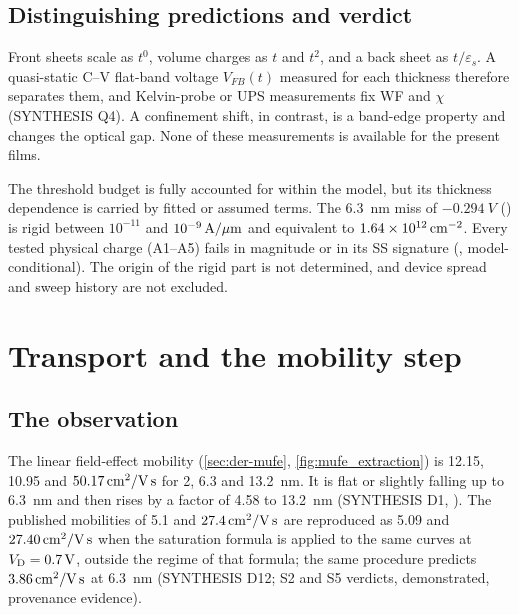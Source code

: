 \subsection{Distinguishing predictions and verdict}
Front sheets scale as $t^0$, volume charges as $t$ and $t^2$, and a back sheet as $t/\varepsilon_s$. A quasi-static C--V flat-band voltage $V_{FB}(t)$ measured for each thickness therefore separates them, and Kelvin-probe or UPS measurements fix WF and $\chi$ (SYNTHESIS Q4). A confinement shift, in contrast, is a band-edge property and changes the optical gap. None of these measurements is available for the present films.

\begin{keyresult}[title={Electrostatics: verdict}]
The threshold budget is fully accounted for within the model, but its thickness dependence is carried by fitted or assumed terms. The \SI{6.3}{nm} miss of $-\SI{0.294}{V}$ () is rigid between $10^{-11}$ and $10^{-9}\,\mathrm{A}/\mu\mathrm{m}$ and equivalent to $1.64\times10^{12}\,\mathrm{cm}^{-2}$. Every tested physical charge (A1--A5) fails in magnitude or in its SS signature (\evNUM, model-conditional). The origin of the rigid part is not determined, and device spread and sweep history are not excluded.
\end{keyresult}

\section{Transport and the mobility step}\label{sec:mech-transport}

\subsection{The observation}
The linear field-effect mobility (\cref{sec:der-mufe}, \cref{fig:mufe_extraction}) is 12.15, 10.95 and $50.17\,\mathrm{cm}^{2}/\mathrm{V\,s}$ for 2, 6.3 and \SI{13.2}{nm}. It is flat or slightly falling up to \SI{6.3}{nm} and then rises by a factor of 4.58 to \SI{13.2}{nm} (SYNTHESIS D1, \evDATA). The published mobilities of 5.1 and $27.4\,\mathrm{cm}^{2}/\mathrm{V\,s}$ are reproduced as 5.09 and $27.40\,\mathrm{cm}^{2}/\mathrm{V\,s}$ when the saturation formula is applied to the same curves at $V_{\mathrm{D}} = \SI{0.7}{V}$, outside the regime of that formula; the same procedure predicts $3.86\,\mathrm{cm}^{2}/\mathrm{V\,s}$ at \SI{6.3}{nm} (SYNTHESIS D12; S2 and S5 verdicts, demonstrated, provenance evidence).

